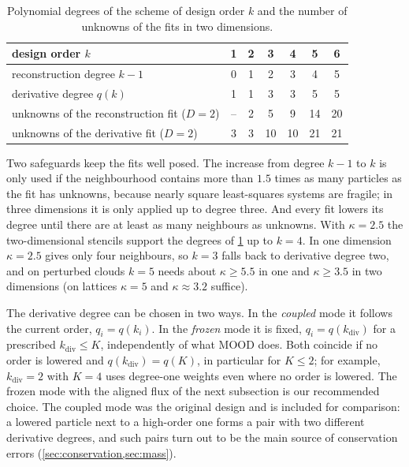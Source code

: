 \documentclass[11pt,a4paper]{article}
\numberwithin{equation}{section}
\newcommand{\qdiv}{q}
\begin{document}
\begin{table}[!htbp]
\centering
\caption{Polynomial degrees of the scheme of design order $k$ and the number of unknowns of the fits in two dimensions.}\label{tab:degrees}
\begin{tabular}{lcccccc}
\toprule
design order $k$ & 1 & 2 & 3 & 4 & 5 & 6\\
\midrule
reconstruction degree $k-1$ & 0 & 1 & 2 & 3 & 4 & 5\\
derivative degree $\qdiv(k)$ & 1 & 1 & 3 & 3 & 5 & 5\\
unknowns of the reconstruction fit ($D=2$) & -- & 2 & 5 & 9 & 14 & 20\\
unknowns of the derivative fit ($D=2$) & 3 & 3 & 10 & 10 & 21 & 21\\
\bottomrule
\end{tabular}
\end{table}

Two safeguards keep the fits well posed. The increase from degree $k-1$ to $k$ is only used if the neighbourhood contains more than $1.5$ times as many particles as the fit has unknowns, because nearly square least-squares systems are fragile; in three dimensions it is only applied up to degree three. And every fit lowers its degree until there are at least as many neighbours as unknowns. With $\kappa=2.5$ the two-dimensional stencils support the degrees of \cref{tab:degrees} up to $k=4$. In one dimension $\kappa=2.5$ gives only four neighbours, so $k=3$ falls back to derivative degree two, and on perturbed clouds $k=5$ needs about $\kappa\ge5.5$ in one and $\kappa\ge3.5$ in two dimensions (on lattices $\kappa=5$ and $\kappa\approx3.2$ suffice).

The derivative degree can be chosen in two ways. In the \emph{coupled} mode it follows the current order, $q_i=\qdiv(k_i)$. In the \emph{frozen} mode it is fixed, $q_i=\qdiv(k_{\mathrm{div}})$ for a prescribed $k_{\mathrm{div}}\le K$, independently of what MOOD does. Both coincide if no order is lowered and $\qdiv(k_{\mathrm{div}})=\qdiv(K)$, in particular for $K\le2$; for example, $k_{\mathrm{div}}=2$ with $K=4$ uses degree-one weights even where no order is lowered. The frozen mode with the aligned flux of the next subsection is our recommended choice. The coupled mode was the original design and is included for comparison: a lowered particle next to a high-order one forms a pair with two different derivative degrees, and such pairs turn out to be the main source of conservation errors (\cref{sec:conservation,sec:mass}).
\end{document}
